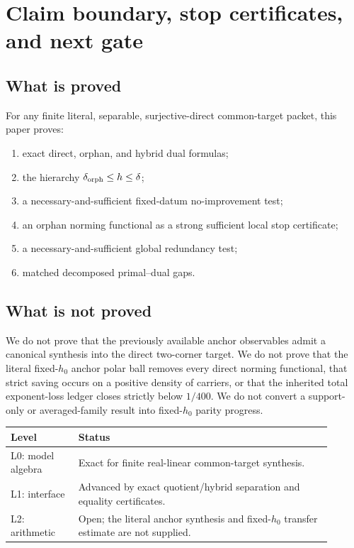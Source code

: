 \section{Claim boundary, stop certificates, and next gate}
\label{sec:boundary}

\subsection*{What is proved}

For any finite literal, separable, surjective-direct common-target
packet, this paper proves:
\begin{enumerate}[label=(C\arabic*),leftmargin=2.7em]
\item exact direct, orphan, and hybrid dual formulas;
\item the hierarchy
\(\delta_{\rm orph}\le h\le\delta\);
\item a necessary-and-sufficient fixed-datum no-improvement test;
\item an orphan norming functional as a strong sufficient local stop
certificate;
\item a necessary-and-sufficient global redundancy test;
\item matched decomposed primal--dual gaps.
\end{enumerate}

\subsection*{What is not proved}

We do not prove that the previously available anchor observables admit
a canonical synthesis into the direct two-corner target.  We do not
prove that the literal fixed-\(h_0\) anchor polar ball removes every
direct norming functional, that strict saving occurs on a positive
density of carriers, or that the inherited total exponent-loss ledger
closes strictly below \(1/400\).  We do not convert a support-only or
averaged-family result into fixed-\(h_0\) parity progress.

\begin{center}
\begin{tabular}{@{}>{\raggedright\arraybackslash}p{0.19\linewidth}
>{\raggedright\arraybackslash}p{0.71\linewidth}@{}}
\toprule
Level & Status\\
\midrule
L0: model algebra &
Exact for finite real-linear common-target synthesis.\\
L1: interface &
Advanced by exact quotient/hybrid separation and equality certificates.\\
L2: arithmetic &
Open; the literal anchor synthesis and fixed-\(h_0\) transfer estimate
are not supplied.\\
\bottomrule
\end{tabular}
\end{center}

